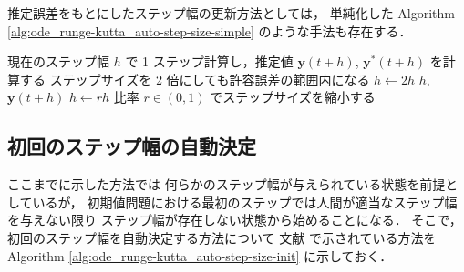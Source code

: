推定誤差をもとにしたステップ幅の更新方法としては，
単純化した
Algorithm \ref{alg:ode_runge-kutta_auto-step-size-simple}
のような手法も存在する．

\begin{algorithm}[tp]
    \caption{簡易的なステップサイズの自動決定 \cite[4.1 節 (a)]{Mitsui1993}}
    \label{alg:ode_runge-kutta_auto-step-size-simple}
    \begin{algorithmic}[1]
        \Loop
        \State 現在のステップ幅 $h$ で 1 ステップ計算し，推定値 $\bm{y}(t + h)$, $\bm{y}^*(t+h)$ を計算する
        \Comment ステップサイズを 2 倍にしても許容誤差の範囲内になる
        \State $h \gets 2 h$
        \EndIf
        \State \Return $h$, $\bm{y}(t + h)$
        \EndIf
        \State $h \gets r h$ \Comment 比率 $r \in (0, 1)$ でステップサイズを縮小する
        \EndLoop
        \EndProcedure
    \end{algorithmic}
\end{algorithm}

\subsection{初回のステップ幅の自動決定}

ここまでに示した方法では
何らかのステップ幅が与えられている状態を前提としているが，
初期値問題における最初のステップでは人間が適当なステップ幅を与えない限り
ステップ幅が存在しない状態から始めることになる．
そこで，初回のステップ幅を自動決定する方法について
文献 \cite[Section II.4]{Hairer1993} で示されている方法を
Algorithm \ref{alg:ode_runge-kutta_auto-step-size-init}
に示しておく．

